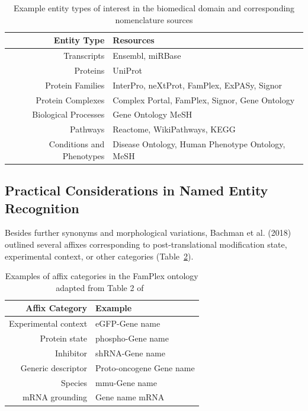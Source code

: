 \begin{table}
    \centering
    \begin{tabular}{ r l }
        Entity Type & Resources \\
        \hline
        Transcripts & Ensembl, miRBase \\
        Proteins & UniProt \\
        Protein Families & InterPro, neXtProt, FamPlex, ExPASy, Signor \\
        Protein Complexes & Complex Portal, FamPlex, Signor, Gene Ontology \\
        Biological Processes & Gene Ontology MeSH \\
        Pathways & Reactome, WikiPathways, KEGG \\
        Conditions and Phenotypes & Disease Ontology, Human Phenotype Ontology, MeSH
    \end{tabular}
    \caption{Example entity types of interest in the biomedical domain and corresponding nomenclature sources}
    \label{tab:other_nomenclature_databases}
\end{table}

\subsection{Practical Considerations in Named Entity Recognition}

Besides further synonyms and morphological variations, Bachman et al. (2018)~\cite{Bachman2018} outlined several affixes corresponding to post-translational modification state, experimental context, or other categories (Table~\ref{tab:affix_categories}).

\begin{table}
    \centering
    \begin{tabular}{ r l }
        Affix Category & Example \\
        \hline
        Experimental context & eGFP-{Gene name} \\
        Protein state & phospho-{Gene name} \\
        Inhibitor & shRNA-{Gene name} \\
        Generic descriptor & Proto-oncogene {Gene name} \\
        Species & mmu-{Gene name} \\
        mRNA grounding & {Gene name} mRNA
    \end{tabular}
    \caption{Examples of affix categories in the FamPlex ontology adapted from Table 2 of~\cite{Bachman2018}}
    \label{tab:affix_categories}
\end{table}

